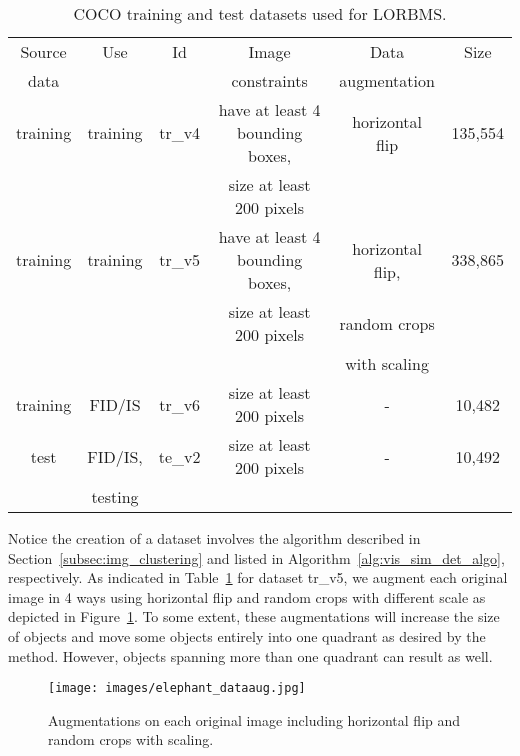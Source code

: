 \documentclass[12pt,a4paper]{article}
\begin{document}
\begin{table}[ht!]
\centering
\begin{tabular}{c|c|c|c|c|c}
\hline
Source & Use & Id & Image & Data & Size \\
data &  &  & constraints & augmentation &  \\
\hline
training & training & tr\_v4 & have at least 4 bounding boxes, & horizontal flip & 135,554 \\
 &  &  & size at least 200 pixels &  &  \\
\hline
training & training & tr\_v5 & have at least 4 bounding boxes, & horizontal flip, & 338,865 \\
&  &  & size at least 200 pixels & random crops &  \\
&  &  &  & with scaling &  \\
\hline
training & FID/IS & tr\_v6 & size at least 200 pixels & - & 10,482 \\
\hline
test & FID/IS, & te\_v2 & size at least 200 pixels & - & 10,492 \\
 & testing &  &  &  &  \\
\hline
\end{tabular}
\caption{COCO training and test datasets used for LORBMS.} \label{tab:coco_datasets}
\end{table}
Notice the creation of a dataset involves the algorithm described in Section~\ref{subsec:img_clustering} and listed in Algorithm~\ref{alg:vis_sim_det_algo}, respectively. As indicated in Table~\ref{tab:coco_datasets} for dataset tr\_v5, we augment each original image in 4 ways using horizontal flip and random crops with different scale as depicted in Figure~\ref{fig:dataaug_elephant}. To some extent, these augmentations will increase the size of objects and move some objects entirely into one quadrant as desired by the method. However, objects spanning more than one quadrant can result as well.
\begin{figure}[ht]
\centering
\texttt{[image: images/elephant\_dataaug.jpg]}
\caption{Augmentations on each original image including horizontal flip and random crops with scaling.}
\label{fig:dataaug_elephant}
\end{figure}
\end{document}
